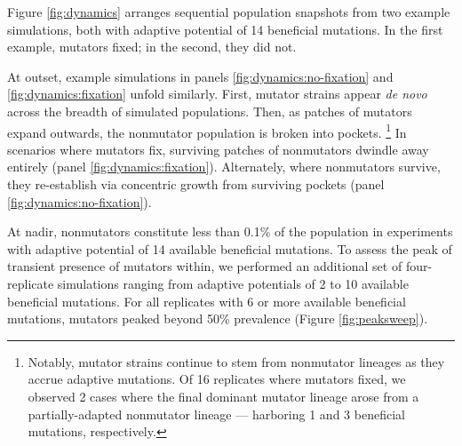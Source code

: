 

Figure \ref{fig:dynamics} arranges sequential population snapshots from two example simulations, both with adaptive potential of 14 beneficial mutations.
In the first example, mutators fixed; in the second, they did not.

At outset, example simulations in panels \ref{fig:dynamics:no-fixation} and \ref{fig:dynamics:fixation} unfold similarly.
First, mutator strains appear \textit{de novo} across the breadth of simulated populations.
Then, as patches of mutators expand outwards, the nonmutator population is broken into pockets.%
\footnote{%
Notably, mutator strains continue to stem from nonmutator lineages as they accrue adaptive mutations.
Of 16 replicates where mutators fixed, we observed 2 cases where the final dominant mutator lineage arose from a partially-adapted nonmutator lineage --- harboring 1 and 3 beneficial mutations, respectively.
}
In scenarios where mutators fix, surviving patches of nonmutators dwindle away entirely (panel \ref{fig:dynamics:fixation}).
Alternately, where nonmutators survive, they re-establish via concentric growth from surviving pockets (panel \ref{fig:dynamics:no-fixation}).



At nadir, nonmutators constitute less than 0.1\% of the population in experiments with adaptive potential of 14 available beneficial mutations.
To assess the peak of transient presence of mutators within, we performed an additional set of four-replicate simulations ranging from adaptive potentials of 2 to 10 available beneficial mutations.
For all replicates with 6 or more available beneficial mutations, mutators peaked beyond 50\% prevalence (Figure \ref{fig:peaksweep}).
